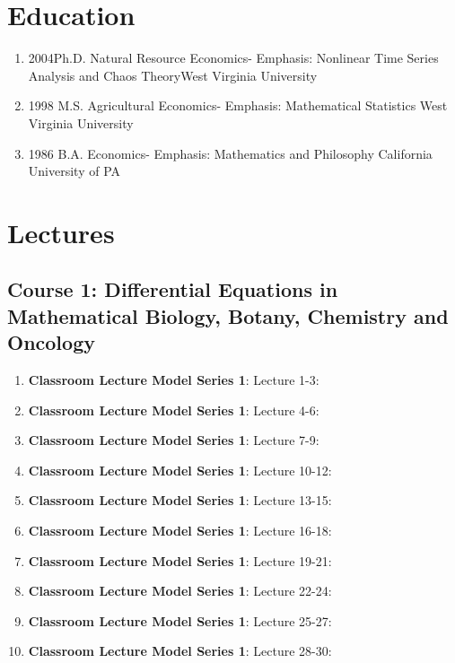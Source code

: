 \documentclass{ResumeDesignFormat1}
\begin{document}
\section{Education}

\begin{enumerate}
\item{2004}{Ph.D. Natural Resource Economics- \textcolor{c5}{Emphasis: Nonlinear Time Series Analysis and Chaos Theory}}{West Virginia University} 
\item{1998} {M.S. Agricultural Economics- \textcolor{c5}{Emphasis: Mathematical Statistics} }{West Virginia University}
\item{1986} {B.A. Economics- \textcolor{c5}{Emphasis: Mathematics and Philosophy} }{California University of PA}
\end{enumerate}

\section{Lectures}
\subsection{Course 1: Differential Equations in Mathematical Biology, Botany, Chemistry and Oncology}

\begin{enumerate}
\item \textbf{Classroom Lecture Model Series 1}: \textcolor{c2}{Lecture 1-3:}
\item \textbf{Classroom Lecture Model Series 1}: \textcolor{c2}{Lecture 4-6:}
\item \textbf{Classroom Lecture Model Series 1}: \textcolor{c2}{Lecture 7-9:}
\item \textbf{Classroom Lecture Model Series 1}: \textcolor{c2}{Lecture 10-12:}
\item \textbf{Classroom Lecture Model Series 1}: \textcolor{c2}{Lecture 13-15:}
\item \textbf{Classroom Lecture Model Series 1}: \textcolor{c2}{Lecture 16-18:}
\item \textbf{Classroom Lecture Model Series 1}: \textcolor{c2}{Lecture 19-21:}
\item \textbf{Classroom Lecture Model Series 1}: \textcolor{c2}{Lecture 22-24:}
\item \textbf{Classroom Lecture Model Series 1}: \textcolor{c2}{Lecture 25-27:}
\item \textbf{Classroom Lecture Model Series 1}: \textcolor{c2}{Lecture 28-30:}
\end{enumerate}
\end{document}
